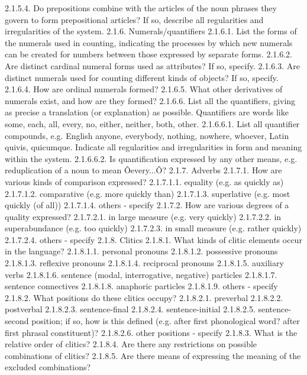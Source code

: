 2.1.5.4. Do prepositions combine with the articles of the noun phrases they govern to form prepositional articles? If so, describe all regularities and irregularities of the system.
2.1.6. Numerals/quantifiers
2.1.6.1. List the forms of the numerals used in counting, indicating the processes by which new numerals can be created for numbers between those expressed by separate forms.
2.1.6.2. Are distinct cardinal numeral forms used as attributes? If so, specify.
2.1.6.3. Are distinct numerals used for counting different kinds of objects? If so, specify.
2.1.6.4. How are ordinal numerals formed?
2.1.6.5. What other derivatives of numerals exist, and how are they formed?
2.1.6.6. List all the quantifiers, giving as precise a translation (or explanation) as possible. Quantifiers are words like some, each, all, every, no, either, neither, both, other.
2.1.6.6.1. List all quantifier compounds, e.g. English anyone, everybody, nothing, nowhere, whoever, Latin quivis, quicumque. Indicate all regularities and irregularities in form and meaning within the system.
2.1.6.6.2. Is quantification expressed by any other means, e.g. reduplication of a noun to mean Ôevery...Õ?
2.1.7. Adverbs
2.1.7.1. How are various kinds of comparison expressed?
2.1.7.1.1. equality (e.g. as quickly as)
2.1.7.1.2. comparative (e.g. more quickly than)
2.1.7.1.3. superlative (e.g. most quickly (of all))
2.1.7.1.4. others - specify
2.1.7.2. How are various degrees of a quality expressed?
2.1.7.2.1. in large measure (e.g. very quickly)
2.1.7.2.2. in superabundance (e.g. too quickly)
2.1.7.2.3. in small measure (e.g. rather quickly)
2.1.7.2.4. others - specify
2.1.8. Clitics
2.1.8.1. What kinds of clitic elements occur in the language?
2.1.8.1.1. personal pronouns
2.1.8.1.2. possessive pronouns
2.1.8.1.3. reflexive pronouns
2.1.8.1.4. reciprocal pronouns
2.1.8.1.5. auxiliary verbs
2.1.8.1.6. sentence (modal, interrogative, negative) particles
2.1.8.1.7. sentence connectives
2.1.8.1.8. anaphoric particles
2.1.8.1.9. others - specify
2.1.8.2. What positions do these clitics occupy?
2.1.8.2.1. preverbal
2.1.8.2.2. postverbal
2.1.8.2.3. sentence-final
2.1.8.2.4. sentence-initial
2.1.8.2.5. sentence-second position; if so, how is this defined (e.g. after first phonological word? after first phrasal constituent)?
2.1.8.2.6. other positions - specify
2.1.8.3. What is the relative order of clitics?
2.1.8.4. Are there any restrictions on possible combinations of clitics?
2.1.8.5. Are there means of expressing the meaning of the excluded combinations?



